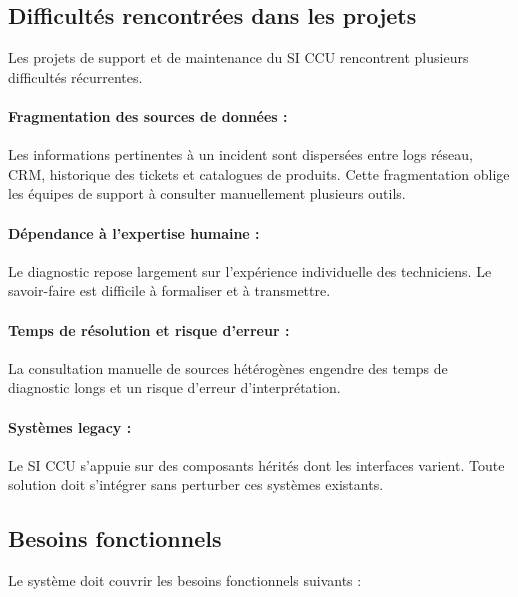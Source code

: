 \subsection{Difficultés rencontrées dans les projets}
Les projets de support et de maintenance du SI CCU rencontrent plusieurs difficultés récurrentes.

\paragraph{Fragmentation des sources de données :}
Les informations pertinentes à un incident sont dispersées entre logs réseau, CRM, historique des tickets et catalogues de produits. Cette fragmentation oblige les équipes de support à consulter manuellement plusieurs outils.

\paragraph{Dépendance à l'expertise humaine :}
Le diagnostic repose largement sur l'expérience individuelle des techniciens. Le savoir-faire est difficile à formaliser et à transmettre.

\paragraph{Temps de résolution et risque d'erreur :}
La consultation manuelle de sources hétérogènes engendre des temps de diagnostic longs et un risque d'erreur d'interprétation.

\paragraph{Systèmes legacy :}
Le SI CCU s'appuie sur des composants hérités dont les interfaces varient. Toute solution doit s'intégrer sans perturber ces systèmes existants.

\subsection{Besoins fonctionnels}
Le système doit couvrir les besoins fonctionnels suivants :

